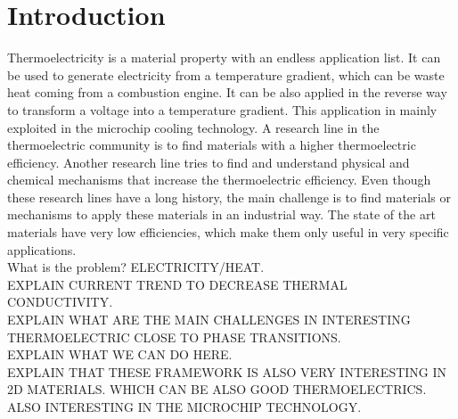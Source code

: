 
\chapter*{Introduction} %

\label{Chapter0} %


Thermoelectricity is a material property with an endless application list. It can be used to generate electricity 
from a temperature gradient, which can be waste heat coming from a combustion engine. It can be also applied in the 
reverse way to transform a voltage into a temperature gradient. This application in mainly exploited in the 
microchip cooling technology. A research line in the thermoelectric community is to find materials with a higher 
thermoelectric efficiency. Another research line tries to find and understand physical and chemical mechanisms that 
increase the thermoelectric efficiency. Even though these research lines have a long history, the main challenge is 
to find materials or mechanisms to apply these materials in an industrial way. The state of the art materials have 
very low efficiencies, which make them only useful in very specific applications. \\

What is the problem? ELECTRICITY/HEAT. \\

EXPLAIN CURRENT TREND TO DECREASE THERMAL CONDUCTIVITY. \\

EXPLAIN WHAT ARE THE MAIN CHALLENGES IN INTERESTING THERMOELECTRIC CLOSE TO PHASE TRANSITIONS. \\

EXPLAIN WHAT WE CAN DO HERE. \\

EXPLAIN THAT THESE FRAMEWORK IS ALSO VERY INTERESTING IN 2D MATERIALS. WHICH CAN BE ALSO GOOD THERMOELECTRICS. ALSO 
INTERESTING IN THE MICROCHIP TECHNOLOGY.

